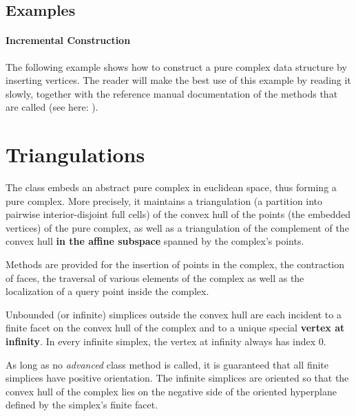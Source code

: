 {{%

\subsection{Examples\label{triangulation:tds:examples}}
 
\paragraph{Incremental Construction}
The following example shows how to construct a pure complex data structure by
inserting vertices. The reader will make the best use of this example by
reading it slowly, together with the reference manual documentation of the
methods that are called (see here: ).




\section{Triangulations}

The class  embeds an abstract pure
complex in euclidean space, thus forming a pure complex. More precisely, it
maintains a triangulation (a partition into pairwise interior-disjoint full
cells) of the convex hull of the points (the embedded vertices) of the
pure complex, as well as a triangulation of the complement of the convex hull
\textbf{in the affine subspace} spanned by the complex's points.

Methods are provided for the insertion of points in the complex, the
contraction of faces, the traversal of various elements of the complex
as well as the localization of a query point inside the complex.

Unbounded (or infinite) simplices outside the convex hull are each incident to
a finite facet on the convex hull of the complex and to a unique special
\textbf{vertex at infinity}. In every infinite simplex, the vertex at infinity
always has index $0$.

As long as no \emph{advanced} class method is called, it is guaranteed that
all finite simplices have positive orientation. The infinite simplices are
oriented so that the convex hull of the complex lies on the negative side of
the oriented hyperplane defined by the simplex's finite facet.


}}
